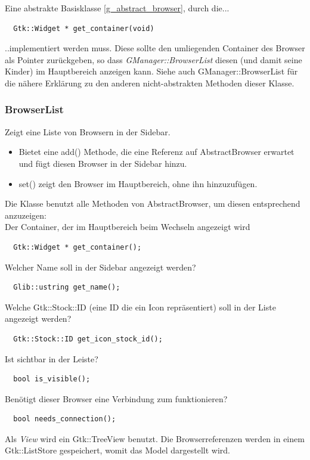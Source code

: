 Eine abstrakte Basisklasse \ref{g_abstract_browser}, durch die...
\begin{verbatim}
  Gtk::Widget * get_container(void) 
\end{verbatim}
..implementiert werden muss. Diese sollte den umliegenden Container des Browser als Pointer zurückgeben,
so dass \textit{GManager::BrowserList} diesen (und damit seine Kinder) im Hauptbereich anzeigen kann.
Siehe auch GManager::BrowserList für die nähere Erklärung zu den anderen nicht-abstrakten Methoden dieser Klasse.

\subsubsection{BrowserList}
%
%
%
Zeigt eine Liste von Browsern in der Sidebar.
\begin{itemize} 
\item Bietet eine add() Methode, die eine Referenz auf AbstractBrowser erwartet und fügt diesen Browser in der Sidebar hinzu.
\item set() zeigt den Browser im Hauptbereich, ohne ihn hinzuzufügen.
\end{itemize}
Die Klasse benutzt alle Methoden von AbstractBrowser, um diesen entsprechend anzuzeigen:
\\
Der Container, der im Hauptbereich beim Wechseln angezeigt wird
\begin{verbatim}
  Gtk::Widget * get_container();
\end{verbatim}
Welcher Name soll in der Sidebar angezeigt werden?
\begin{verbatim}
  Glib::ustring get_name();
\end{verbatim}
Welche Gtk::Stock::ID (eine ID die ein Icon repräsentiert) soll in der Liste angezeigt werden?
\begin{verbatim}
  Gtk::Stock::ID get_icon_stock_id();
\end{verbatim} 
Ist sichtbar in der Leiste?
\begin{verbatim}
  bool is_visible(); 
\end{verbatim}
Benötigt dieser Browser eine Verbindung zum funktionieren?
\begin{verbatim}
  bool needs_connection(); 
\end{verbatim}

Als \emph{View} wird ein Gtk::TreeView benutzt. Die Browserreferenzen werden in einem Gtk::ListStore gespeichert,
womit das Model dargestellt wird. 

